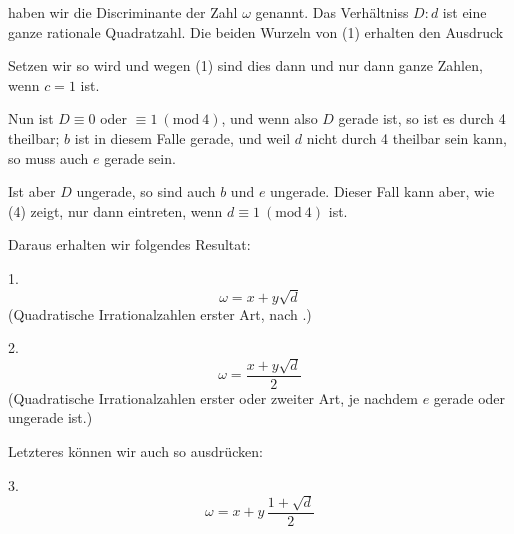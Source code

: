 haben wir die Discriminante der Zahl $\omega$ genannt. Das Verh\"altniss $D:d$ ist eine ganze rationale Quadratzahl. Die beiden Wurzeln von (1) erhalten den Ausdruck

Setzen wir
so wird
und wegen (1) sind dies dann und nur dann ganze Zahlen, wenn $c=1$ ist.

Nun ist $D\equiv 0$ oder $\equiv 1\ (\mathrm{mod}\ 4)$, und wenn also $D$ gerade ist, so ist es durch 4 theilbar; $b$ ist in diesem Falle gerade, und weil $d$ nicht durch 4 theilbar sein kann, so muss auch $e$ gerade sein.

Ist aber $D$ ungerade, so sind auch $b$ und $e$ ungerade. Dieser Fall kann aber, wie (4) zeigt, nur dann eintreten, wenn $d\equiv 1\ (\mathrm{mod}\ 4)$ ist.

Daraus erhalten wir folgendes Resultat:

1. 
\[ \omega = x + y\sqrt{d} \]
 (Quadratische Irrationalzahlen erster Art, nach .)

2. 
\[ \omega = \frac{x+y\sqrt{d}}{2} \]
 (Quadratische Irrationalzahlen erster oder zweiter Art, je nachdem $e$ gerade oder ungerade ist.)

Letzteres k\"onnen wir auch so ausdr\"ucken:

3. 
\[ \omega = x + y\,\frac{1+\sqrt{d}}{2} \]
